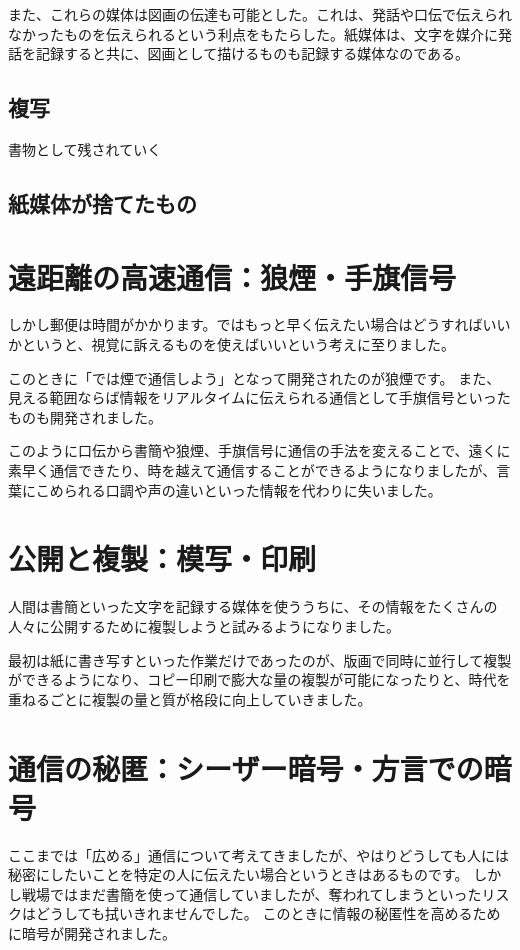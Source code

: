 また、これらの媒体は図画の伝達も可能とした。これは、発話や口伝で伝えられなかったものを伝えられるという利点をもたらした。紙媒体は、文字を媒介に発話を記録すると共に、図画として描けるものも記録する媒体なのである。

\subsection{複写}
書物として残されていく

\subsection{紙媒体が捨てたもの}


\section{遠距離の高速通信：狼煙・手旗信号}


しかし郵便は時間がかかります。ではもっと早く伝えたい場合はどうすればいいかというと、視覚に訴えるものを使えばいいという考えに至りました。

このときに「では煙で通信しよう」となって開発されたのが狼煙です。
また、見える範囲ならば情報をリアルタイムに伝えられる通信として手旗信号といったものも開発されました。

このように口伝から書簡や狼煙、手旗信号に通信の手法を変えることで、遠くに素早く通信できたり、時を越えて通信することができるようになりましたが、言葉にこめられる口調や声の違いといった情報を代わりに失いました。

\section{公開と複製：模写・印刷}

人間は書簡といった文字を記録する媒体を使ううちに、その情報をたくさんの人々に公開するために複製しようと試みるようになりました。

最初は紙に書き写すといった作業だけであったのが、版画で同時に並行して複製ができるようになり、コピー印刷で膨大な量の複製が可能になったりと、時代を重ねるごとに複製の量と質が格段に向上していきました。

\section{通信の秘匿：シーザー暗号・方言での暗号}

ここまでは「広める」通信について考えてきましたが、やはりどうしても人には秘密にしたいことを特定の人に伝えたい場合というときはあるものです。
しかし戦場ではまだ書簡を使って通信していましたが、奪われてしまうといったリスクはどうしても拭いきれませんでした。
このときに情報の秘匿性を高めるために暗号が開発されました。

